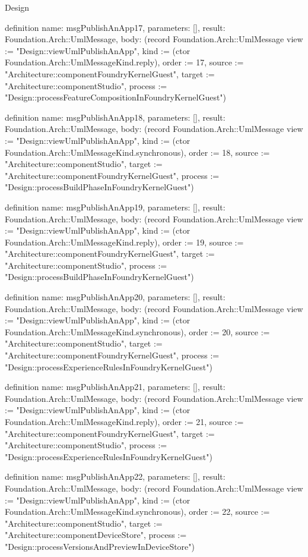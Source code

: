 \begin{lexlean}{Design}
\begin{semanticmodule}
definition{
  name: msgPublishAnApp17,
  parameters: [],
  result: Foundation.Arch::UmlMessage,
  body: (record Foundation.Arch::UmlMessage {view := "Design::viewUmlPublishAnApp", kind := (ctor Foundation.Arch::UmlMessageKind.reply), order := 17, source := "Architecture::componentFoundryKernelGuest", target := "Architecture::componentStudio", process := "Design::processFeatureCompositionInFoundryKernelGuest"})
}

definition{
  name: msgPublishAnApp18,
  parameters: [],
  result: Foundation.Arch::UmlMessage,
  body: (record Foundation.Arch::UmlMessage {view := "Design::viewUmlPublishAnApp", kind := (ctor Foundation.Arch::UmlMessageKind.synchronous), order := 18, source := "Architecture::componentStudio", target := "Architecture::componentFoundryKernelGuest", process := "Design::processBuildPhaseInFoundryKernelGuest"})
}

definition{
  name: msgPublishAnApp19,
  parameters: [],
  result: Foundation.Arch::UmlMessage,
  body: (record Foundation.Arch::UmlMessage {view := "Design::viewUmlPublishAnApp", kind := (ctor Foundation.Arch::UmlMessageKind.reply), order := 19, source := "Architecture::componentFoundryKernelGuest", target := "Architecture::componentStudio", process := "Design::processBuildPhaseInFoundryKernelGuest"})
}

definition{
  name: msgPublishAnApp20,
  parameters: [],
  result: Foundation.Arch::UmlMessage,
  body: (record Foundation.Arch::UmlMessage {view := "Design::viewUmlPublishAnApp", kind := (ctor Foundation.Arch::UmlMessageKind.synchronous), order := 20, source := "Architecture::componentStudio", target := "Architecture::componentFoundryKernelGuest", process := "Design::processExperienceRulesInFoundryKernelGuest"})
}

definition{
  name: msgPublishAnApp21,
  parameters: [],
  result: Foundation.Arch::UmlMessage,
  body: (record Foundation.Arch::UmlMessage {view := "Design::viewUmlPublishAnApp", kind := (ctor Foundation.Arch::UmlMessageKind.reply), order := 21, source := "Architecture::componentFoundryKernelGuest", target := "Architecture::componentStudio", process := "Design::processExperienceRulesInFoundryKernelGuest"})
}

definition{
  name: msgPublishAnApp22,
  parameters: [],
  result: Foundation.Arch::UmlMessage,
  body: (record Foundation.Arch::UmlMessage {view := "Design::viewUmlPublishAnApp", kind := (ctor Foundation.Arch::UmlMessageKind.synchronous), order := 22, source := "Architecture::componentStudio", target := "Architecture::componentDeviceStore", process := "Design::processVersionsAndPreviewInDeviceStore"})
}


\end{semanticmodule}
\end{lexlean}

